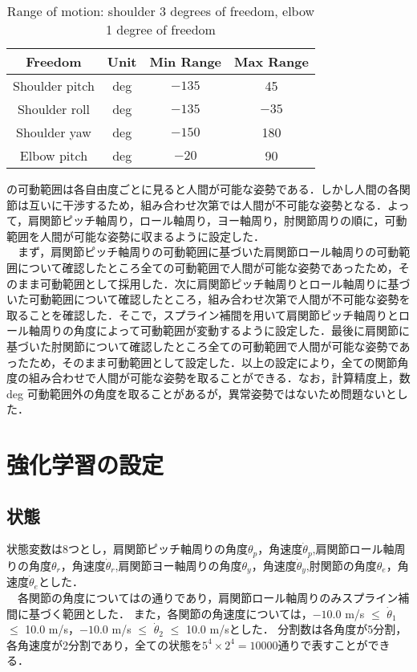 
\begin{table}[tb]
  \begin{center}
    \caption{Range of motion: shoulder 3 degrees of freedom, elbow 1 degree of freedom}
    \begin{tabular}{c|c|c|c}
      \hline
      Freedom & Unit & Min Range & Max Range \\
      \hline
      Shoulder pitch & deg & $-135$ & 45 \\
      Shoulder roll & deg & $-135$ & $-35$ \\
      Shoulder yaw & deg & $-150$ & 180 \\
      Elbow pitch & deg & $-20$ & 90 \\
      \hline
    \end{tabular}
  \end{center}
\end{table}

の可動範囲は各自由度ごとに見ると人間が可能な姿勢である．しかし人間の各関節は互いに干渉するため，組み合わせ次第では人間が不可能な姿勢となる．よって，肩関節ピッチ軸周り，ロール軸周り，ヨー軸周り，肘関節周りの順に，可動範囲を人間が可能な姿勢に収まるように設定した．\\
　まず，肩関節ピッチ軸周りの可動範囲に基づいた肩関節ロール軸周りの可動範囲について確認したところ全ての可動範囲で人間が可能な姿勢であったため，そのまま可動範囲として採用した．次に肩関節ピッチ軸周りとロール軸周りに基づいた可動範囲について確認したところ，組み合わせ次第で人間が不可能な姿勢を取ることを確認した．そこで，スプライン補間\cite{spline}を用いて肩関節ピッチ軸周りとロール軸周りの角度によって可動範囲が変動するように設定した．最後に肩関節に基づいた肘関節について確認したところ全ての可動範囲で人間が可能な姿勢であったため，そのまま可動範囲として設定した．以上の設定により，全ての関節角度の組み合わせで人間が可能な姿勢を取ることができる．なお，計算精度上，数 deg 可動範囲外の角度を取ることがあるが，異常姿勢ではないため問題ないとした．


\section{強化学習の設定}
\subsection{状態}
状態変数は8つとし，肩関節ピッチ軸周りの角度$\theta_{p}$，角速度$\dot{\theta}_{p}$,肩関節ロール軸周りの角度$\theta_{r}$，角速度$\dot{\theta}_{r}$,肩関節ヨー軸周りの角度$\theta_{y}$，角速度$\dot{\theta}_{y}$,肘関節の角度$\theta_{e}$，角速度$\dot{\theta}_{e}$とした．\\
　各関節の角度についてはの通りであり，肩関節ロール軸周りのみスプライン補間に基づく範囲とした．
また，各関節の角速度については，$-10.0$ m/s $\le$ $\dot{\theta}_{1}$ $\le$ 10.0 m/s，$-10.0$ m/s $\le$ $\dot{\theta}_{2}$ $\le$ 10.0 m/sとした．
分割数は各角度が5分割，各角速度が2分割であり，全ての状態を$5^{4}\times 2^{4}=10000$通りで表すことができる．

